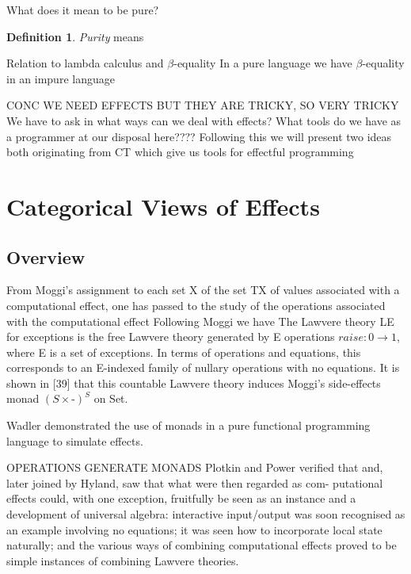 \documentclass[a4paper,10pt]{article}
\theoremstyle{definition}
\newtheorem{definition}{Definition}[section]
\begin{document}
What does it mean to be pure?
\begin{definition}
    \textit{Purity} means
\end{definition}

Relation to lambda calculus and $\beta$-equality
In a pure language we have $\beta$-equality
in an impure language 

CONC WE NEED EFFECTS BUT THEY ARE TRICKY, SO VERY TRICKY
We have to ask in what ways can we deal with effects?
What tools do we have as a programmer at our disposal here????
Following this we will present two ideas both originating from CT
which give us tools for effectful programming

\section{Categorical Views of Effects}
\subsection{Overview}
From Moggi’s assignment to each set X of the set TX of values associated with a computational effect,
one has passed to the study of the operations associated with the computational effect
\cite{hyland2007category}
Following Moggi we have \cite{plotkin2001adequacy}
The Lawvere theory LE for exceptions is the free Lawvere theory generated by E operations $raise : 0 \rightarrow  1$,
where E is a set of exceptions.
In terms of operations and equations,
this corresponds to an E-indexed family of nullary operations with no equations.
It is shown in [39]
that this countable Lawvere theory induces Moggi’s side-effects monad $(S \times \textrm{-})^S$ on
Set.
\cite{hyland2007category}

Wadler \cite{wadler1990comprehending} demonstrated the use of monads in a pure
functional programming language to simulate effects.

OPERATIONS GENERATE MONADS \cite{plotkin2001adequacy}
Plotkin and Power verified that and, later joined by Hyland, saw that what were then regarded as com- putational effects could, with one exception, fruitfully be seen as an instance and a development of universal algebra: interactive input/output was soon recognised as an example involving no equations; it was seen how to incorporate local state naturally; and the various ways of combining computational effects proved to be simple instances of combining Lawvere theories.
\end{document}
